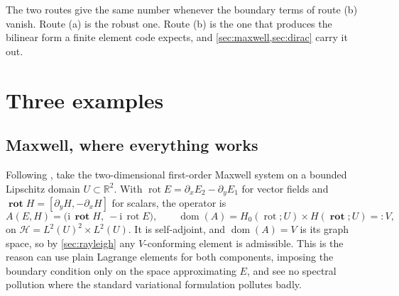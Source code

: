 \documentclass[11pt,a4paper]{article}
\theoremstyle{plain}
\newcommand{\R}{\mathbb{R}}
\newcommand{\Hb}{\mathcal{H}}
\newcommand{\Vb}{V}
\newcommand{\ii}{\mathrm{i}}
\DeclareMathOperator{\dom}{dom}
\DeclareMathOperator{\rot}{rot}
\DeclareMathOperator{\Rot}{\mathbf{rot}}
\begin{document}
The two routes give the same number whenever the boundary terms of route (b)
vanish.  Route (a) is the robust one.  Route (b) is the one that produces the
bilinear form a finite element code expects, and \cref{sec:maxwell,sec:dirac}
carry it out.

\section{Three examples}
\label{sec:examples}

\subsection{Maxwell, where everything works}
\label{sec:maxwell}

Following \cite[\S3.4.4, p.~130]{Colbrook2026}, take the two-dimensional
first-order Maxwell system on a bounded Lipschitz domain $U \subset \R^2$.  With
$\rot E = \partial_x E_2 - \partial_y E_1$ for vector fields and $\Rot H =
[\partial_y H, -\partial_x H]$ for scalars, the operator is
\begin{equation}
  \label{eq:maxwellop}
  A(E,H) = \bigl(\ii\,\Rot H,\ -\ii\,\rot E\bigr),
  \qquad
  \dom(A) = H_0(\rot;U) \times H(\Rot;U) =: \Vb ,
\end{equation}
on $\Hb = L^2(U)^2 \times L^2(U)$.  It is self-adjoint, and $\dom(A) = \Vb$ is
its graph space, so by \cref{sec:rayleigh} any $\Vb$-conforming element is
admissible.  This is the reason \cite{Colbrook2026} can use plain Lagrange
elements for both components, imposing the boundary condition only on the space
approximating $E$, and see no spectral pollution where the standard variational
formulation pollutes badly.
\end{document}
